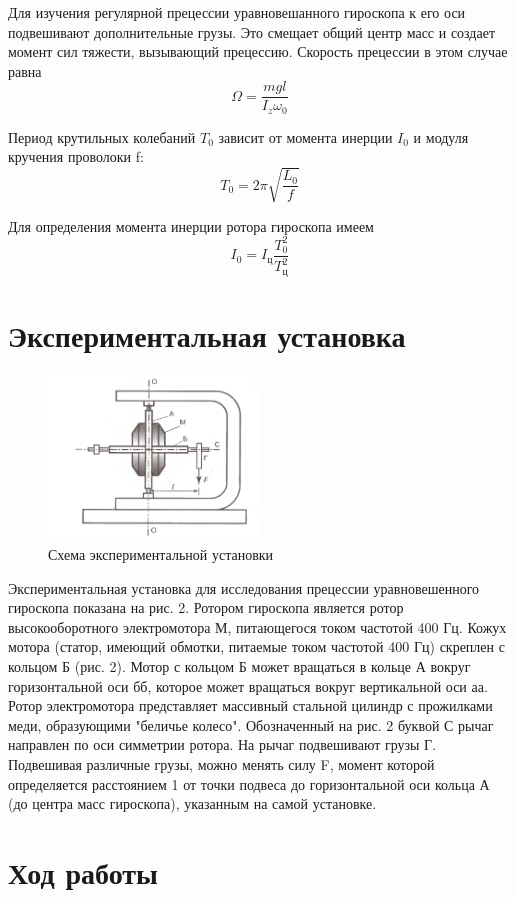 \documentclass[a4paper]{article}
\begin{document}
Для изучения регулярной прецессии уравновешанного гироскопа к его оси подвешивают дополнительные грузы.
Это смещает общий центр масс и создает момент сил тяжести, вызывающий прецессию. Скорость прецессии в этом случае равна 
\[\Omega = \frac{mgl}{I_{z}\omega_{0}} \]

Период крутильных колебаний $T_{0}$ зависит от момента инерции $I_{0}$ и модуля кручения проволоки f:
\[T_{0} = 2\pi \sqrt{\frac{L_{0}}{f} }\]

Для определения момента инерции ротора гироскопа имеем
\[I_{0} = I_{\text{ц}}\frac{T_{0}^2}{T_{\text{ц}}^2} \]


\section{Экспериментальная установка}

\begin{figure}
    \centering
    \includegraphics[width=0.5\textwidth]{pick2.PNG}
    \caption{Схема экспериментальной установки}
\end{figure}

Экспериментальная установка для исследования прецессии уравновешенного гироскопа показана на рис. 2. Ротором гироскопа является ротор высокооборотного электромотора М, питающегося током частотой 400 Гц. Кожух мотора (статор, имеющий обмотки, питаемые током частотой 400 Гц) скреплен с кольцом Б (рис. 2). 
Мотор с кольцом Б может вращаться в кольце А вокруг горизонтальной оси бб, которое может вращаться вокруг вертикальной оси аа. Ротор электромотора представляет массивный стальной цилиндр с прожилками меди, образующими "беличье колесо". Обозначенный на рис. 2 буквой С рычаг направлен по оси симметрии ротора. На рычаг подвешивают грузы Г. Подвешивая различные грузы, можно менять силу F, момент которой определяется расстоянием 1 от точки подвеса до горизонтальной оси кольца А (до центра масс гироскопа), указанным на самой установке.
\newpage
\section{Ход работы}
\end{document}

